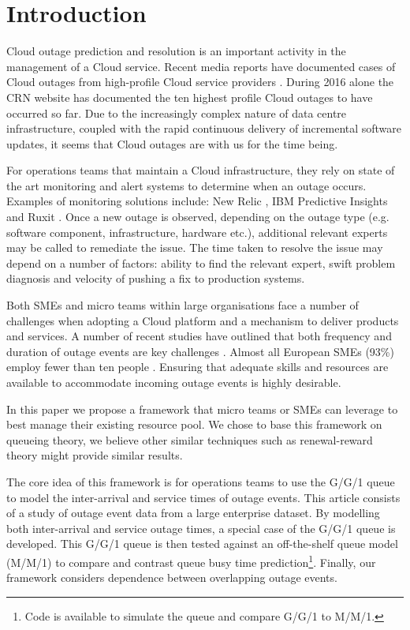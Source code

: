\documentclass[5p]{elsarticle}
\begin{document}
\linenumbers

\section{Introduction}
Cloud outage prediction and resolution is an important activity in the management of a Cloud service. Recent media reports have documented cases of Cloud outages from high-profile Cloud service providers \cite{CRN2016outage}. During 2016 alone the CRN website has documented the ten highest profile Cloud outages to have occurred so far.  Due to the increasingly complex nature of data centre infrastructure, coupled with the rapid continuous delivery of incremental software updates, it seems that Cloud outages are with us for the time being.


For operations teams that maintain a Cloud infrastructure, they rely on state of the art monitoring and alert systems to determine when an outage occurs. Examples of monitoring solutions include: New Relic \cite{newrelic}, IBM Predictive Insights \cite{predinsight} and Ruxit \cite{ruxit}. Once a new outage is observed, depending on the outage type (e.g. software component, infrastructure, hardware etc.), additional relevant experts may be called to remediate the issue. The time taken to resolve the issue may depend on a number of factors: ability to find the relevant expert, swift problem diagnosis and velocity of pushing a fix to production systems. 

Both SMEs and micro teams within large organisations face a number of challenges when adopting a Cloud platform and a mechanism to deliver products and services. A number of recent studies have outlined that both frequency and duration of outage events are key challenges \cite{InfoWorld2015outage}. Almost all European SMEs (93\%) employ fewer than ten people \cite{europa2015sme}. Ensuring that adequate skills and resources are available to accommodate incoming outage events is highly desirable.

In this paper we propose a framework that micro teams or SMEs can leverage to best manage their existing resource pool. We chose to base this framework on queueing theory, we believe other similar techniques such as renewal-reward theory might provide similar results.

The core idea of this framework is for operations teams to use the G/G/1 queue to model the inter-arrival and service times of outage events. This article consists of a study of outage event data from a large enterprise dataset. By modelling both inter-arrival and service outage times, a special case of the G/G/1 queue is developed. This G/G/1 queue is then tested against an off-the-shelf queue model (M/M/1) to compare and contrast queue busy time prediction\footnote{Code is available to simulate the queue and compare G/G/1 to M/M/1.}. Finally, our framework considers dependence between overlapping outage events. 
\end{document}
